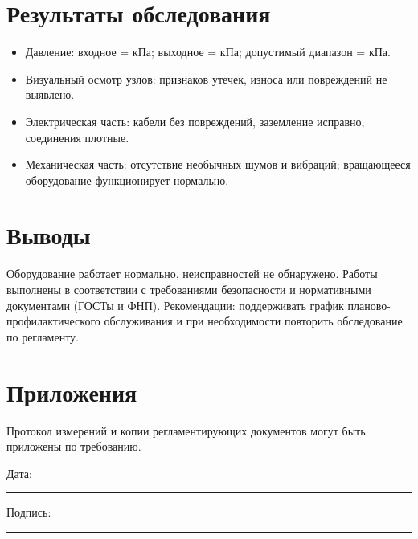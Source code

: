 \documentclass[12pt]{article}
\begin{document}
\section*{Результаты обследования}
\begin{itemize}
\item Давление: входное = \underline{\hspace{2.5cm}} кПа; выходное = \underline{\hspace{2.5cm}} кПа; допустимый диапазон = \underline{\hspace{2.5cm}} кПа.
\item Визуальный осмотр узлов: признаков утечек, износа или повреждений не выявлено.
\item Электрическая часть: кабели без повреждений, заземление исправно, соединения плотные.
\item Механическая часть: отсутствие необычных шумов и вибраций; вращающееся оборудование функционирует нормально.
\end{itemize}

\section*{Выводы}
Оборудование работает нормально, неисправностей не обнаружено. Работы выполнены в соответствии с требованиями безопасности и нормативными документами (ГОСТы и ФНП). Рекомендации: поддерживать график планово-профилактического обслуживания и при необходимости повторить обследование по регламенту.

\section*{Приложения}
Протокол измерений и копии регламентирующих документов могут быть приложены по требованию.

\vfill

\noindent
Дата: \rule{5cm}{0.4pt} \hfill Подпись: \rule{5cm}{0.4pt}
\end{document}
